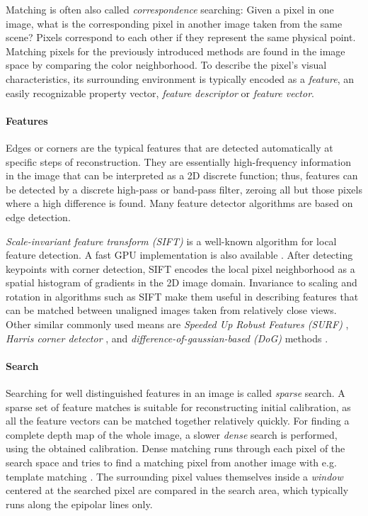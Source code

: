Matching is often also called \emph{correspondence} searching:
Given a pixel in one image, what is the corresponding pixel in another image taken from the same scene?
Pixels correspond to each other if they represent the same physical point.
Matching pixels for the previously introduced methods are found in the image space by comparing the color neighborhood.
To describe the pixel's visual characteristics, its surrounding environment is typically encoded as a \emph{feature}, an easily recognizable property vector, \emph{feature descriptor} or \emph{feature vector}.
\cite[ch. 4]{szeliski10vision}

\paragraph{Features}
Edges or corners are the typical features that are detected automatically at specific steps of reconstruction.
They are essentially high-frequency information in the image that can be interpreted as a 2D discrete function; thus, features can be detected by a discrete high-pass or band-pass filter, zeroing all but those pixels where a high difference is found. \cite{marr1980theory}
Many feature detector algorithms are based on edge detection. %

\emph{Scale-invariant feature transform (SIFT)} \cite{lowe1999object} is a well-known algorithm for local feature detection.
A fast GPU implementation is also available \cite{changchang2007siftgpu}.
After detecting keypoints with corner detection, SIFT encodes the local pixel neighborhood as a spatial histogram of gradients in the 2D image domain.
Invariance to scaling and rotation in algorithms such as SIFT make them useful in describing features that can be matched between unaligned images taken from relatively close views.
Other similar commonly used means are \emph{Speeded Up Robust Features (SURF)} \cite{bay2006surf}, \emph{Harris corner detector} \cite{harris1988combined}, and \emph{difference-of-gaussian-based (DoG)} methods \cite[p. 152]{szeliski10vision}.

\paragraph{Search}
Searching for well distinguished features in an image is called \emph{sparse} search.
A sparse set of feature matches is suitable for reconstructing initial calibration, as all the feature vectors can be matched together relatively quickly.
For finding a complete depth map of the whole image, a slower \emph{dense} search is performed, using the obtained calibration.
Dense matching runs through each pixel of the search space and tries to find a matching pixel from another image with e.g. template matching \cite{duda1973pattern}.
The surrounding pixel values themselves inside a \emph{window} centered at the searched pixel are compared in the search area, which typically runs along the epipolar lines only.

